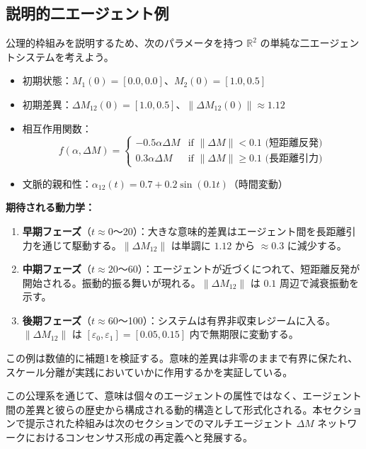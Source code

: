 \documentclass[11pt,a4paper]{article}
\theoremstyle{definition}
\begin{document}
\subsection{説明的二エージェント例}

公理的枠組みを説明するため、次のパラメータを持つ $\mathbb{R}^2$ の単純な二エージェントシステムを考えよう。

\begin{itemize}
\item 初期状態：$M_1(0) = [0.0, 0.0]$、$M_2(0) = [1.0, 0.5]$
\item 初期差異：$\Delta M_{12}(0) = [1.0, 0.5]$、$\|\Delta M_{12}(0)\| \approx 1.12$
\item 相互作用関数：
\[
f(\alpha, \Delta M) = \begin{cases}
-0.5 \alpha \Delta M & \text{if } \|\Delta M\| < 0.1 \text{ (短距離反発)} \\
0.3 \alpha \Delta M & \text{if } \|\Delta M\| \geq 0.1 \text{ (長距離引力)}
\end{cases}
\]
\item 文脈的親和性：$\alpha_{12}(t) = 0.7 + 0.2\sin(0.1t)$（時間変動）
\end{itemize}

\textbf{期待される動力学：}
\begin{enumerate}
\item \textbf{早期フェーズ}（$t \approx 0$～20）：大きな意味的差異はエージェント間を長距離引力を通じて駆動する。$\|\Delta M_{12}\|$ は単調に $1.12$ から $\approx 0.3$ に減少する。

\item \textbf{中期フェーズ}（$t \approx 20$～60）：エージェントが近づくにつれて、短距離反発が開始される。振動的振る舞いが現れる。$\|\Delta M_{12}\|$ は $0.1$ 周辺で減衰振動を示す。

\item \textbf{後期フェーズ}（$t \approx 60$～100）：システムは有界非収束レジームに入る。$\|\Delta M_{12}\|$ は $[\varepsilon_0, \varepsilon_1] = [0.05, 0.15]$ 内で無期限に変動する。
\end{enumerate}

この例は数値的に補題1を検証する。意味的差異は非零のままで有界に保たれ、スケール分離が実践においていかに作用するかを実証している。

この公理系を通じて、意味は個々のエージェントの属性ではなく、エージェント間の差異と彼らの歴史から構成される動的構造として形式化される。本セクションで提示された枠組みは次のセクションでのマルチエージェント $\Delta M$ ネットワークにおけるコンセンサス形成の再定義へと発展する。
\end{document}
